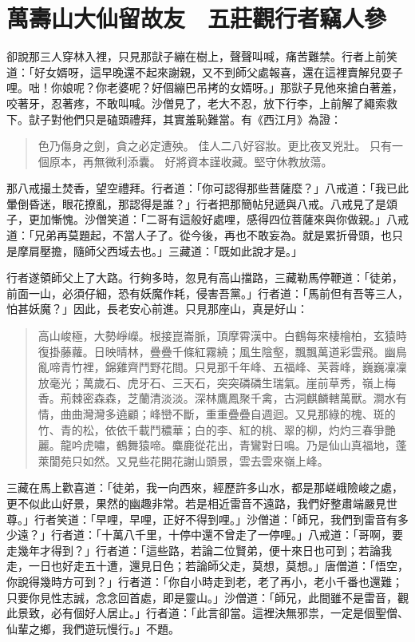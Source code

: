 
\chapter{萬壽山大仙留故友　五莊觀行者竊人參}

卻說那三人穿林入裡，只見那獃子繃在樹上，聲聲叫喊，痛苦難禁。行者上前笑道：「好女婿呀，這早晚還不起來謝親，又不到師父處報喜，還在這裡賣解兒耍子哩。咄！你娘呢？你老婆呢？好個繃巴吊拷的女婿呀。」那獃子見他來搶白著羞，咬著牙，忍著疼，不敢叫喊。沙僧見了，老大不忍，放下行李，上前解了繩索救下。獃子對他們只是磕頭禮拜，其實羞恥難當。有《西江月》為證：
\begin{quote}
色乃傷身之劍，貪之必定遭殃。
佳人二八好容妝。更比夜叉兇壯。
只有一個原本，再無微利添囊。
好將資本謹收藏。堅守休教放蕩。
\end{quote}

那八戒撮土焚香，望空禮拜。行者道：「你可認得那些菩薩麼？」八戒道：「我已此暈倒昏迷，眼花撩亂，那認得是誰？」行者把那簡帖兒遞與八戒。八戒見了是頌子，更加慚愧。沙僧笑道：「二哥有這般好處哩，感得四位菩薩來與你做親。」八戒道：「兄弟再莫題起，不當人子了。從今後，再也不敢妄為。就是累折骨頭，也只是摩肩壓擔，隨師父西域去也。」三藏道：「既如此說才是。」

行者遂領師父上了大路。行夠多時，忽見有高山擋路，三藏勒馬停鞭道：「徒弟，前面一山，必須仔細，恐有妖魔作耗，侵害吾黨。」行者道：「馬前但有吾等三人，怕甚妖魔？」因此，長老安心前進。只見那座山，真是好山：
\begin{quote}
高山峻極，大勢崢嶸。根接崑崙脈，頂摩霄漢中。白鶴每來棲檜柏，玄猿時復掛藤蘿。日映晴林，疊疊千條紅霧繞；風生陰壑，飄飄萬道彩雲飛。幽鳥亂啼青竹裡，錦雞齊鬥野花間。只見那千年峰、五福峰、芙蓉峰，巍巍凜凜放毫光；萬歲石、虎牙石、三天石，突突磷磷生瑞氣。崖前草秀，嶺上梅香。荊棘密森森，芝蘭清淡淡。深林鷹鳳聚千禽，古洞麒麟轄萬獸。澗水有情，曲曲灣灣多遶顧；峰巒不斷，重重疊疊自週迴。又見那綠的槐、斑的竹、青的松，依依千載鬥穠華；白的李、紅的桃、翠的柳，灼灼三春爭艷麗。龍吟虎嘯，鶴舞猿啼。麋鹿從花出，青鸞對日鳴。乃是仙山真福地，蓬萊閬苑只如然。又見些花開花謝山頭景，雲去雲來嶺上峰。
\end{quote}

三藏在馬上歡喜道：「徒弟，我一向西來，經歷許多山水，都是那嵯峨險峻之處，更不似此山好景，果然的幽趣非常。若是相近雷音不遠路，我們好整肅端嚴見世尊。」行者笑道：「早哩，早哩，正好不得到哩。」沙僧道：「師兄，我們到雷音有多少遠？」行者道：「十萬八千里，十停中還不曾走了一停哩。」八戒道：「哥啊，要走幾年才得到？」行者道：「這些路，若論二位賢弟，便十來日也可到；若論我走，一日也好走五十遭，還見日色；若論師父走，莫想，莫想。」唐僧道：「悟空，你說得幾時方可到？」行者道：「你自小時走到老，老了再小，老小千番也還難；只要你見性志誠，念念回首處，即是靈山。」沙僧道：「師兄，此間雖不是雷音，觀此景致，必有個好人居止。」行者道：「此言卻當。這裡決無邪祟，一定是個聖僧、仙輩之鄉，我們遊玩慢行。」不題。

